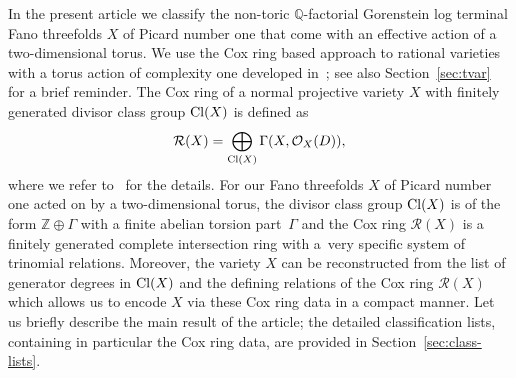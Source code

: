 \documentclass[10pt,a4paper]{amsart}
\theoremstyle{definition}
\def\Cl{{\rm Cl}}
\def\ZZ{{\mathbb Z}}
\def\QQ{{\mathbb Q}}
\numberwithin{equation}{section}
\begin{document}
In the present article we classify the non-toric $\QQ$-factorial
Gorenstein log terminal Fano threefolds $X$ of Picard
number one that come with an effective action of a
two-dimensional torus.
We use the Cox ring based approach to rational
varieties with a torus action of complexity one developed
in~\cite{HaHe, HaSu}; see also
Section~\ref{sec:tvar} for a brief reminder.
The Cox ring of a normal projective variety $X$
with finitely generated divisor class group $\Cl(X)$
is defined as
\[
\mathcal{R}(X)
 =
\bigoplus_{\Cl(X)} \Gamma(X,\mathcal{O}_X(D)),
\]
where we refer to~\cite{ArDeHaLa} for the details.
For our Fano threefolds $X$ of Picard number one
acted on by a two-dimensional torus,
the divisor class group $\Cl(X)$ is of the form
$\ZZ \oplus \Gamma$ with a finite abelian torsion
part~$\Gamma$ and the Cox ring $\mathcal{R}(X)$ is a finitely
generated complete intersection ring with a~very
specific system of trinomial relations.
Moreover, the variety $X$ can be reconstructed
from the list of generator degrees in $\Cl(X)$
and the defining relations of the Cox ring
$\mathcal{R}(X)$ which allows us to encode $X$
via these Cox ring data in a compact manner.
Let us briefly describe the main result of the
article; the detailed classification lists, containing
in particular the Cox ring data,
are provided in Section~\ref{sec:class-lists}.
\end{document}
